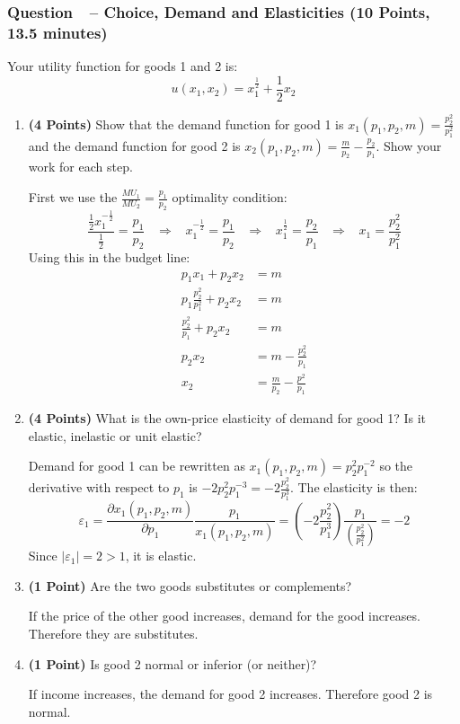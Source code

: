 \documentclass[11pt]{article}
\newcounter{question}[section]
\newcommand{\question}[1]{\refstepcounter{question}
  \subsubsection*{Question~\thequestion~-- #1}}
\newenvironment{subquestions}{
  \begin{enumerate}[label=(\roman*)]}{\end{enumerate}}
\begin{document}
\question{Choice, Demand and Elasticities (10 Points, 13.5 minutes)}
Your utility function for goods 1 and 2 is:
\[
  u\left( x_1,x_2 \right)=x_1^{\frac{1}{2}} + \frac{1}{2}x_2
\]
\begin{subquestions}
\item \textbf{(4 Points)} Show that the demand function for good 1 is $x_1\left( p_1,p_2,m \right)=\frac{p_2^2}{p_1^2}$ and the demand function for good 2 is $x_2\left( p_1,p_2,m \right)=\frac{m}{p_2}-\frac{p_2}{p_1}$. Show your work for each step.

  \textcolor{solution-color}{
    First we use the $\frac{MU_1}{MU_2}=\frac{p_1}{p_2}$ optimality condition:
    \[\frac{\frac{1}{2}x_1^{-\frac{1}{2}}}{\frac{1}{2}}=\frac{p_1}{p_2}
      \;\;\;\Longrightarrow\;\;\;
    x_1^{-\frac{1}{2}}=\frac{p_1}{p_2}
      \;\;\;\Longrightarrow\;\;\;
    x_1^{\frac{1}{2}}=\frac{p_2}{p_1}
      \;\;\;\Longrightarrow\;\;\;
    x_1=\frac{p^2_2}{p^2_1}
    \]
    Using this in the budget line:
    \begin{align*}
      p_1x_1+p_2x_2&=m\\
      p_1\frac{p^2_2}{p^2_1}+p_2x_2&=m\\
      \frac{p^2_2}{p_1}+p_2x_2&=m\\
      p_2x_2&=m-\frac{p^2_2}{p_1}\\
      x_2&=\frac{m}{p_2}-\frac{p^2}{p_1}
    \end{align*}
  }
\item \textbf{(4 Points)} What is the own-price elasticity of demand for good 1? Is it elastic, inelastic or unit elastic?

  \textcolor{solution-color}{
    Demand for good 1 can be rewritten as $x_1\left( p_1,p_2,m \right)=p_2^2p_1^{-2}$ so the derivative with respect to $p_1$ is $-2p_2^2p_1^{-3}=-2\frac{p_2^2}{p_1^3}$. The elasticity is then:
    \[
      \varepsilon_1=\frac{\partial x_1\left( p_1,p_2,m \right)}{\partial p_1}\frac{p_1}{x_{1}\left( p_1,p_2,m \right)}=\left( -2\frac{p_2^2}{p_1^3}\right)\frac{p_1}{\left( \frac{p_2^2}{p_1^2} \right)}=-2
    \]
    Since $\left| \varepsilon_1 \right|=2>1$, it is elastic.
   }
  \item \textbf{(1 Point)} Are the two goods substitutes or complements?

  \textcolor{solution-color}{
    If the price of the other good increases, demand for the good increases. Therefore they are substitutes.
  }
  \item \textbf{(1 Point)} Is good 2 normal or inferior (or neither)?

  \textcolor{solution-color}{
    If income increases, the demand for good 2 increases. Therefore good 2 is normal.
  }
\end{subquestions}
\end{document}
